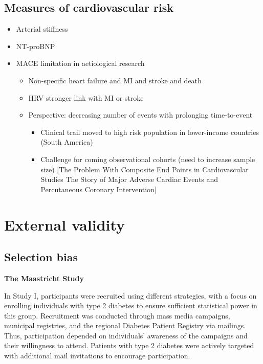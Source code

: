 \documentclass[
  a4paper,
  headsepline=true,
  open=any]{scrbook}
\providecommand{\tightlist}{%
  \setlength{\itemsep}{0pt}\setlength{\parskip}{0pt}}\usepackage{longtable,booktabs,array}
\begin{document}
\hypertarget{measures-of-cardiovascular-risk}{%
\subsection{Measures of cardiovascular
risk}\label{measures-of-cardiovascular-risk}}

\begin{itemize}
\tightlist
\item
  Arterial stiffness
\item
  NT-proBNP
\item
  MACE limitation in aetiological research

  \begin{itemize}
  \tightlist
  \item
    Non-specific heart failure and MI and stroke and death
  \item
    HRV stronger link with MI or stroke
  \item
    Perspective: decreasing number of events with prolonging
    time-to-event

    \begin{itemize}
    \tightlist
    \item
      Clinical trail moved to high risk population in lower-income
      countries (South America)
    \item
      Challenge for coming observational cohorts (need to increase
      sample size) {[}The Problem With Composite End Points in
      Cardiovascular Studies The Story of Major Adverse Cardiac Events
      and Percutaneous Coronary Intervention{]}
    \end{itemize}
  \end{itemize}
\end{itemize}

\hypertarget{external-validity}{%
\section{External validity}\label{external-validity}}

\hypertarget{selection-bias}{%
\subsection{Selection bias}\label{selection-bias}}

\textbf{The Maastricht Study}

In Study I, participants were recruited using different strategies, with
a focus on enrolling individuals with type 2 diabetes to ensure
sufficient statistical power in this group. Recruitment was conducted
through mass media campaigns, municipal registries, and the regional
Diabetes Patient Registry via mailings. Thus, participation depended on
individuals' awareness of the campaigns and their willingness to attend.
Patients with type 2 diabetes were actively targeted with additional
mail invitations to encourage participation.
\end{document}
